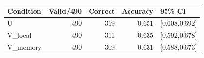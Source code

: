 \begin{tabular}{lrrrl}
\toprule Condition & Valid/490 & Correct & Accuracy & 95\% CI \\
\midrule
U & 490 & 319 & 0.651 & [0.608,0.692] \\
V\_local & 490 & 311 & 0.635 & [0.592,0.678] \\
V\_memory & 490 & 309 & 0.631 & [0.588,0.673] \\
\bottomrule
\end{tabular}
